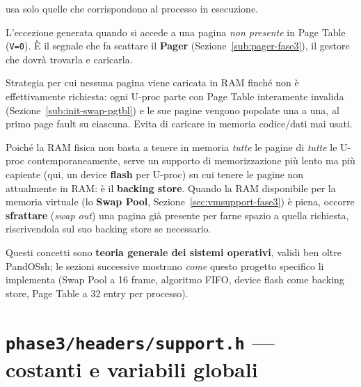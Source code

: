 \documentclass[11pt,a4paper]{article}
\newcommand{\code}[1]{\texttt{#1}}
\begin{document}
\begin{description}[style=nextline,leftmargin=0pt]
  usa solo quelle che corrispondono al processo in esecuzione.
\item[Page fault] L'eccezione generata quando si accede a una pagina
  \emph{non presente} in Page Table (\code{V=0}). \`E il segnale che fa
  scattare il \textbf{Pager} (Sezione~\ref{sub:pager-fase3}), il gestore
  che dovrà trovarla e caricarla.
\item[Paginazione a domanda (\emph{demand paging})] Strategia per cui
  nessuna pagina viene caricata in RAM finché non è effettivamente
  richiesta: ogni U-proc parte con Page Table interamente invalida
  (Sezione~\ref{sub:init-swap-pgtbl}) e le sue pagine vengono popolate una a
  una, al primo page fault su ciascuna. Evita di caricare in memoria
  codice/dati mai usati.
\item[Backing store e swapping] Poiché la RAM fisica non basta a tenere in
  memoria \emph{tutte} le pagine di \emph{tutte} le U-proc
  contemporaneamente, serve un supporto di memorizzazione più lento ma più
  capiente (qui, un device \textbf{flash} per U-proc) su cui tenere le
  pagine non attualmente in RAM: è il \textbf{backing store}. Quando la RAM
  disponibile per la memoria virtuale (lo \textbf{Swap Pool},
  Sezione~\ref{sec:vmsupport-fase3}) è
  piena, occorre \textbf{sfrattare} (\emph{swap out}) una pagina già
  presente per farne spazio a quella richiesta, riscrivendola sul suo
  backing store se necessario.
\end{description}

Questi concetti sono \textbf{teoria generale dei sistemi operativi}, validi
ben oltre PandOSsh; le sezioni successive mostrano \emph{come} questo
progetto specifico li implementa (Swap Pool a 16 frame, algoritmo FIFO,
device flash come backing store, Page Table a 32 entry per processo).

\section{\code{phase3/headers/support.h} --- costanti e variabili globali}
\end{document}
